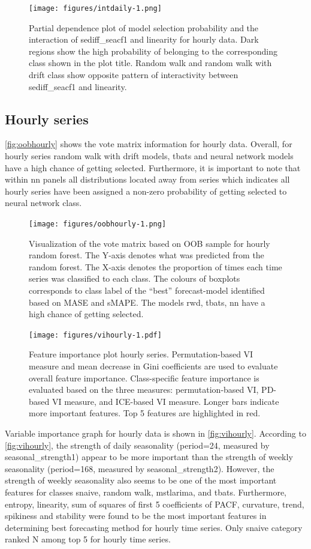 \documentclass[11pt,a4paper,]{article}
\begin{document}
\begin{figure}
\centering
\texttt{[image: figures/intdaily-1.png]}
\caption{\label{fig:intdaily}Partial dependence plot of model selection probability and the interaction of sediff\_seacf1 and linearity for hourly data. Dark regions show the high probability of belonging to the corresponding class shown in the plot title. Random walk and random walk with drift class show opposite pattern of interactivity between sediff\_seacf1 and linearity.}
\end{figure}

\hypertarget{hourly-series}{%
\subsection{Hourly series}\label{hourly-series}}

\autoref{fig:oobhourly} shows the vote matrix information for hourly data. Overall, for hourly series random walk with drift models, tbats and neural network models have a high chance of getting selected. Furthermore, it is important to note that within nn panels all distributions located away from series which indicates all hourly series have been assigned a non-zero probability of getting selected to neural network class.

\begin{figure}
\centering
\texttt{[image: figures/oobhourly-1.png]}
\caption{\label{fig:oobhourly}Visualization of the vote matrix based on OOB sample for hourly random forest. The Y-axis denotes what was predicted from the random forest. The X-axis denotes the proportion of times each time series was classified to each class. The colours of boxplots corresponds to class label of the ``best'' forecast-model identified based on MASE and sMAPE. The models rwd, tbats, nn have a high chance of getting selected.}
\end{figure}

\begin{figure}
\centering
\texttt{[image: figures/vihourly-1.pdf]}
\caption{\label{fig:vihourly}Feature importance plot hourly series. Permutation-based VI measure and mean decrease in Gini coefficients are used to evaluate overall feature importance. Class-specific feature importance is evaluated based on the three measures: permutation-based VI, PD-based VI measure, and ICE-based VI measure. Longer bars indicate more important features. Top 5 features are highlighted in red.}
\end{figure}

Variable importance graph for hourly data is shown in \autoref{fig:vihourly}. According to \autoref{fig:vihourly}, the strength of daily
seasonality (period=24, measured by seasonal\_strength1) appear to be more important than the strength of weekly seasonality (period=168, measured by seasonal\_strength2). However, the strength of weekly seasonality also seems to be one of the most important features for classes snaive, random walk, mstlarima, and tbats. Furthermore, entropy, linearity, sum of squares of first 5 coefficients of PACF, curvature, trend, spikiness and stability were found to be the most important features in determining best forecasting method for hourly time series. Only snaive category ranked N among top 5 for hourly time series.
\end{document}
